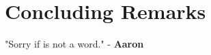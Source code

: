 \setcounter{chapter}{10}
\chapter{Concluding Remarks}
\large
"Sorry if  is not a word." - \textbf{Aaron}

